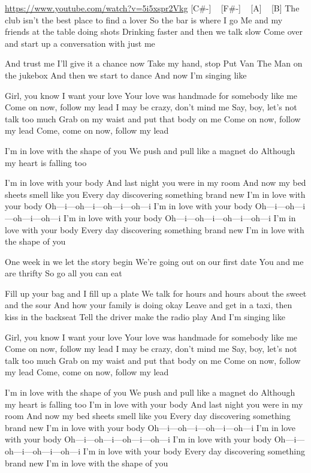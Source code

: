 \url{https://www.youtube.com/watch?v=5i5xspr2Vkg}
[C#-] ~ [F#-] ~ [A] ~ [B]
The club isn't the best place to find a lover
So the bar is where I go
Me and my friends at the table doing shots
Drinking faster and then we talk slow
Come over and start up a conversation with just me

And trust me I'll give it a chance now
Take my hand, stop
Put Van The Man on the jukebox
And then we start to dance
And now I'm singing like

Girl, you know I want your love
Your love was handmade for somebody like me
Come on now, follow my lead
I may be crazy, don't mind me
Say, boy, let's not talk too much
Grab on my waist and put that body on me
Come on now, follow my lead
Come, come on now, follow my lead

I'm in love with the shape of you
We push and pull like a magnet do
Although my heart is falling too

I'm in love with your body
And last night you were in my room
And now my bed sheets smell like you
Every day discovering something brand new
I'm in love with your body
Oh—i—oh—i—oh—i—oh—i
I'm in love with your body
Oh—i—oh—i—oh—i—oh—i
I'm in love with your body
Oh—i—oh—i—oh—i—oh—i
I'm in love with your body
Every day discovering something brand new
I'm in love with the shape of you

One week in we let the story begin
We're going out on our first date
You and me are thrifty
So go all you can eat

Fill up your bag and I fill up a plate
We talk for hours and hours about the sweet and the sour
And how your family is doing okay
Leave and get in a taxi, then kiss in the backseat
Tell the driver make the radio play
And I'm singing like

Girl, you know I want your love
Your love was handmade for somebody like me
Come on now, follow my lead
I may be crazy, don't mind me
Say, boy, let's not talk too much
Grab on my waist and put that body on me
Come on now, follow my lead
Come, come on now, follow my lead


I'm in love with the shape of you
We push and pull like a magnet do
Although my heart is falling too
I'm in love with your body
And last night you were in my room
And now my bed sheets smell like you
Every day discovering something brand new
I'm in love with your body
Oh—i—oh—i—oh—i—oh—i
I'm in love with your body
Oh—i—oh—i—oh—i—oh—i
I'm in love with your body
Oh—i—oh—i—oh—i—oh—i
I'm in love with your body
Every day discovering something brand new
I'm in love with the shape of you

